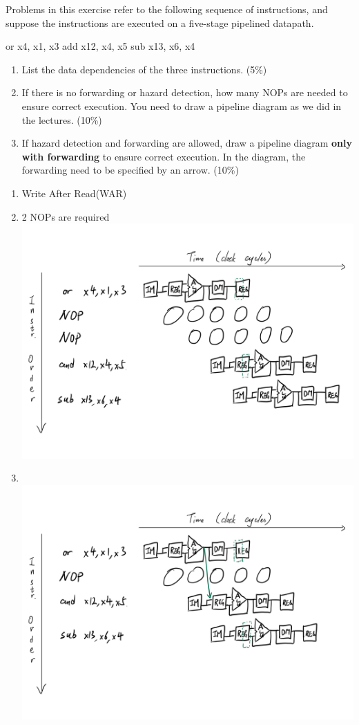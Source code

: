 \documentclass[12pt, a4paper]{article}
\begin{document}
\begin{q}{25}
    Problems in this exercise refer to the following sequence of instructions, and suppose the
instructions are executed on a five-stage pipelined datapath.
\begin{code}
    or x4, x1, x3
    add x12, x4, x5
    sub x13, x6, x4
\end{code}
\begin{enumerate}
    \item List the data dependencies of the three instructions. (5\%)
    \item If there is no forwarding or hazard detection, how many NOPs are needed to ensure correct execution. You need to draw a pipeline diagram as we did in the lectures. (10\%)
    \item If hazard detection and forwarding are allowed, draw a pipeline diagram \textbf{only with forwarding} to ensure correct execution. In the diagram, the forwarding need to be specified by an arrow. (10\%)
\end{enumerate}
\end{q}
\begin{ans}
    \begin{enumerate}
        \item Write After Read(WAR)
        \item 2 NOPs are required \\\includegraphics[width=.6\linewidth]{../figs/q3.2-2.jpg}
        \item \text{ }\\\includegraphics[width=.6\linewidth]{../figs/q3.3-3.jpg}
    \end{enumerate}
\end{ans}
\pagebreak
\end{document}
